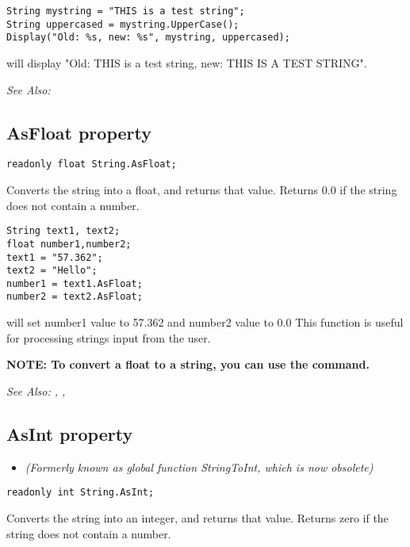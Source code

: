 \begin{verbatim}
String mystring = "THIS is a test string";
String uppercased = mystring.UpperCase();
Display("Old: %s, new: %s", mystring, uppercased);
\end{verbatim}
will display "Old: THIS is a test string, new: THIS IS A TEST STRING".

\it{See Also:} 


\subsection{AsFloat property}\label{String.AsFloat}%

\begin{verbatim}
readonly float String.AsFloat;
\end{verbatim}
Converts the string into a float, and returns that value. Returns
0.0 if the string does not contain a number.

\begin{verbatim}
String text1, text2;
float number1,number2;
text1 = "57.362";
text2 = "Hello";
number1 = text1.AsFloat;
number2 = text2.AsFloat;
\end{verbatim}
will set number1 value to 57.362 and number2 value to 0.0
This function is useful for processing strings input from the user.

\bf{NOTE:} To convert a float to a string, you can use the 
command.

\it{See Also:} ,
,


\subsection{AsInt property}\label{String.AsInt}%

\begin{itemize}
\item \it{(Formerly known as global function StringToInt, which is now obsolete)}
\end{itemize}

\begin{verbatim}
readonly int String.AsInt;
\end{verbatim}
Converts the string into an integer, and returns that value. Returns
zero if the string does not contain a number.

